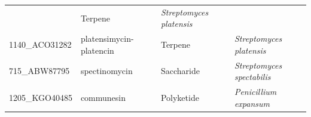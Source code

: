 \documentclass[12pt,twoside]{reedthesis}
\begin{document}
\begin{longtable}[]{@{}llll@{}}
\begin{minipage}[t]{0.20\columnwidth}
  \end{minipage} & \begin{minipage}[t]{0.15\columnwidth}\raggedright\strut
  Terpene\strut
  \end{minipage} & \begin{minipage}[t]{0.34\columnwidth}\raggedright\strut
  \emph{Streptomyces platensis}\strut
  \end{minipage}\tabularnewline
  \begin{minipage}[t]{0.19\columnwidth}\raggedright\strut
  1140\_ACO31282\strut
  \end{minipage} & \begin{minipage}[t]{0.20\columnwidth}\raggedright\strut
  platensimycin- platencin\strut
  \end{minipage} & \begin{minipage}[t]{0.15\columnwidth}\raggedright\strut
  Terpene\strut
  \end{minipage} & \begin{minipage}[t]{0.34\columnwidth}\raggedright\strut
  \emph{Streptomyces platensis}\strut
  \end{minipage}\tabularnewline
  \begin{minipage}[t]{0.19\columnwidth}\raggedright\strut
  715\_ABW87795\strut
  \end{minipage} & \begin{minipage}[t]{0.20\columnwidth}\raggedright\strut
  spectinomycin\strut
  \end{minipage} & \begin{minipage}[t]{0.15\columnwidth}\raggedright\strut
  Saccharide\strut
  \end{minipage} & \begin{minipage}[t]{0.34\columnwidth}\raggedright\strut
  \emph{Streptomyces spectabilis}\strut
  \end{minipage}\tabularnewline
  \begin{minipage}[t]{0.19\columnwidth}\raggedright\strut
  1205\_KGO40485\strut
  \end{minipage} & \begin{minipage}[t]{0.20\columnwidth}\raggedright\strut
  communesin\strut
  \end{minipage} & \begin{minipage}[t]{0.15\columnwidth}\raggedright\strut
  Polyketide\strut
  \end{minipage} & \begin{minipage}[t]{0.34\columnwidth}\raggedright\strut
  \emph{Penicillium expansum}\strut
  \end{minipage}\tabularnewline

\end{longtable}
\end{document}
